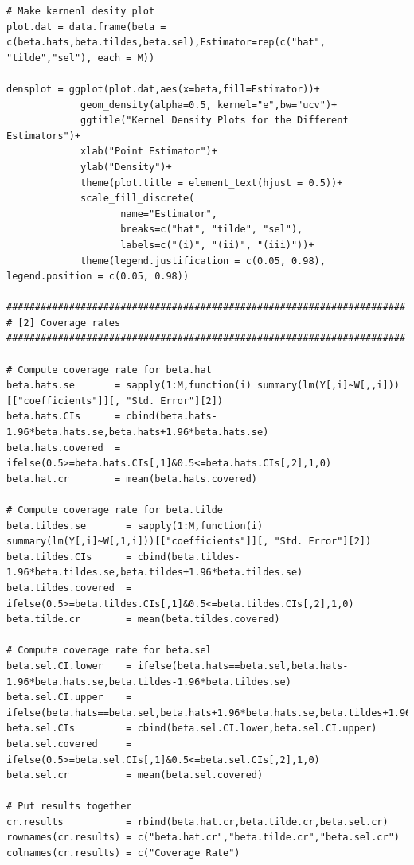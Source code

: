 \documentclass[12pt]{article}
\begin{document}
\begin{verbatim}
# Make kernenl desity plot
plot.dat = data.frame(beta = c(beta.hats,beta.tildes,beta.sel),Estimator=rep(c("hat", "tilde","sel"), each = M))

densplot = ggplot(plot.dat,aes(x=beta,fill=Estimator))+ 
             geom_density(alpha=0.5, kernel="e",bw="ucv")+
             ggtitle("Kernel Density Plots for the Different Estimators")+
             xlab("Point Estimator")+
             ylab("Density")+
             theme(plot.title = element_text(hjust = 0.5))+
             scale_fill_discrete( 
                    name="Estimator",
                    breaks=c("hat", "tilde", "sel"),
                    labels=c("(i)", "(ii)", "(iii)"))+
             theme(legend.justification = c(0.05, 0.98), legend.position = c(0.05, 0.98))

######################################################################
# [2] Coverage rates
######################################################################

# Compute coverage rate for beta.hat
beta.hats.se       = sapply(1:M,function(i) summary(lm(Y[,i]~W[,,i]))[["coefficients"]][, "Std. Error"][2])
beta.hats.CIs      = cbind(beta.hats-1.96*beta.hats.se,beta.hats+1.96*beta.hats.se)
beta.hats.covered  = ifelse(0.5>=beta.hats.CIs[,1]&0.5<=beta.hats.CIs[,2],1,0)
beta.hat.cr        = mean(beta.hats.covered)

# Compute coverage rate for beta.tilde
beta.tildes.se       = sapply(1:M,function(i) summary(lm(Y[,i]~W[,1,i]))[["coefficients"]][, "Std. Error"][2])
beta.tildes.CIs      = cbind(beta.tildes-1.96*beta.tildes.se,beta.tildes+1.96*beta.tildes.se)
beta.tildes.covered  = ifelse(0.5>=beta.tildes.CIs[,1]&0.5<=beta.tildes.CIs[,2],1,0)
beta.tilde.cr        = mean(beta.tildes.covered)

# Compute coverage rate for beta.sel
beta.sel.CI.lower    = ifelse(beta.hats==beta.sel,beta.hats-1.96*beta.hats.se,beta.tildes-1.96*beta.tildes.se)
beta.sel.CI.upper    = ifelse(beta.hats==beta.sel,beta.hats+1.96*beta.hats.se,beta.tildes+1.96*beta.tildes.se)
beta.sel.CIs         = cbind(beta.sel.CI.lower,beta.sel.CI.upper)
beta.sel.covered     = ifelse(0.5>=beta.sel.CIs[,1]&0.5<=beta.sel.CIs[,2],1,0)
beta.sel.cr          = mean(beta.sel.covered)

# Put results together
cr.results           = rbind(beta.hat.cr,beta.tilde.cr,beta.sel.cr)
rownames(cr.results) = c("beta.hat.cr","beta.tilde.cr","beta.sel.cr")
colnames(cr.results) = c("Coverage Rate")

\end{verbatim}
\end{document}
